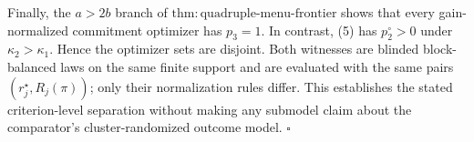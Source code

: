 Finally, the \(a>2b\) branch of \(\mathrm{thm:quadruple\text{-}menu\text{-}frontier}\) shows that every gain-normalized commitment optimizer has \(p_3=1\). In contrast, (5) has \(p_2^\circ>0\) under \(\kappa_2>\kappa_1\). Hence the optimizer sets are disjoint. Both witnesses are blinded block-balanced laws on the same finite support and are evaluated with the same pairs \((r_j^\star,R_j(\pi))\); only their normalization rules differ. This establishes the stated criterion-level separation without making any submodel claim about the comparator's cluster-randomized outcome model. \(\square\)